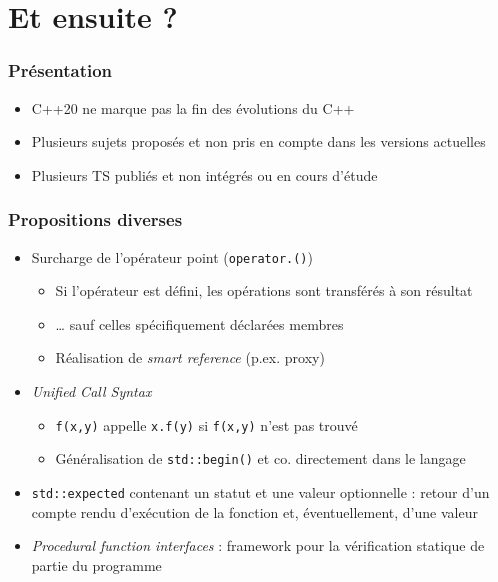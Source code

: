 \documentclass[C++.tex]{subfiles}
\begin{document}
\section{Et ensuite ?}

\begin{frame}
	\frametitle{Présentation}
	\begin{itemize}
		\item C++20 ne marque pas la fin des évolutions du C++
		\item Plusieurs sujets proposés et non pris en compte dans les versions actuelles
		\item Plusieurs TS publiés et non intégrés ou en cours d'étude
	\end{itemize}
\end{frame}

\begin{frame}
	\frametitle{Propositions diverses}
	\begin{itemize}
		\item Surcharge de l'opérateur point (\lstinline|operator.()|)
		\begin{itemize}
			\item Si l'opérateur est défini, les opérations sont transférés à son résultat
			\item \ldots{} sauf celles spécifiquement déclarées membres
			\item Réalisation de \og \textit{smart reference}\fg{} (p.ex. proxy)
		\end{itemize}
		\item \textit{Unified Call Syntax}
		\begin{itemize}
			\item \lstinline|f(x,y)| appelle \lstinline|x.f(y)| si \lstinline|f(x,y)| n'est pas trouvé
			\item Généralisation de \lstinline|std::begin()| et co. directement dans le langage
		\end{itemize}
		\item \lstinline|std::expected| contenant un statut et une valeur optionnelle : retour d'un compte rendu d'exécution de la fonction et, éventuellement, d'une valeur


		\item \textit{Procedural function interfaces} : framework pour la vérification statique de partie du programme


\end{itemize}
\end{frame}
\end{document}
